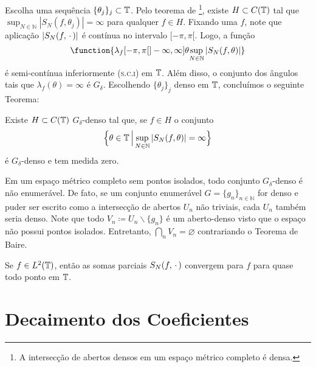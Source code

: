 \documentclass[../main.tex]{subfiles}
\begin{document}
Escolha uma sequência $\{\theta_j\}_j\subset \mathbb T$. Pelo teorema de \cite{baire1899fonctions}\footnote{A intersecção de abertos densos em um espaço métrico completo é densa.}, existe $H \subset C(\mathbb T)$ tal que $\sup_{N\in \mathbb N} |S_N(f,\theta_j)| = \infty$ para qualquer $f \in H$. Fixando uma $f$, note que aplicação $|S_N(f, \operatorname{\,\cdot\,})|$  é contínua no intervalo $[-\pi, \pi[$. Logo, a função
\begin{equation*}
    \function{{\lambda_f}{[-\pi, \pi[}{]-\infty, \infty]}{\theta}{\sup_{N\in\mathbb N}|S_N(f, \theta)|}}
\end{equation*}
é semi-contínua inferiormente (\textsc{s.c.i}) em $\mathbb T$. Além disso, o conjunto dos ângulos tais que  $\lambda_f(\theta) = \infty$  é $G_\delta$. Escolhendo $\{\theta_j\}_j$ denso em $\mathbb T$, concluímos o seguinte Teorema:

\begin{teorema}
    \label{teo: aula02 - angulos com soma infinita eh Gdelta denso}
    Existe $H\subset C(\mathbb T)$ $G_\delta$-denso tal que, se $f\in H$ o conjunto
    \begin{equation*}
        \Big\{\theta \in \mathbb T \,\Big|\, {\sup_{N\in\mathbb N}|S_N(f, \theta)|} = \infty\Big\}
    \end{equation*}
     é $G_\delta$-denso e tem medida zero.
\end{teorema}

\begin{observacao}
    \label{obs: Gdelta denso eh nao enumeravel em espacos sem pontos isolados}
    Em um espaço métrico completo sem pontos isolados, todo conjunto $G_\delta$-denso é não enumerável. De fato, se um conjunto enumerável $G = \{g_n\}_{n \in \mathbb N}$ for denso e puder ser escrito como a intersecção de abertos $U_n$ não triviais, cada $U_n$ também seria denso. Note que todo $V_n \coloneqq U_n \backslash \{g_n\}$ é um aberto-denso visto que o espaço não possui pontos isolados. Entretanto, $\bigcap_n V_n = \varnothing$ contrariando o Teorema de Baire.
\end{observacao}

\begin{invocacao}
    Se $f\in L^2(\mathbb T)$, então as somas parciais $S_N(f, \operatorname{\,\cdot\,})$ convergem para $f$ para quase todo ponto em $\mathbb T$.
\end{invocacao}

\section{Decaimento dos Coeficientes}
\end{document}
